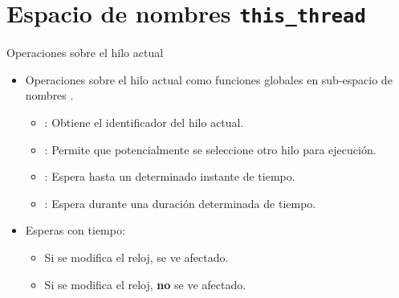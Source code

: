 \section{Espacio de nombres \texttt{this\_thread}}

\begin{frame}[t]{Operaciones sobre el hilo actual}
\begin{itemize}
  \item Operaciones sobre el hilo actual como funciones globales en sub-espacio de nombres .
    \begin{itemize}
      \item {}: Obtiene el identificador del hilo actual.
      \item {}: Permite que potencialmente se seleccione otro hilo para ejecución.
      \item {}: Espera hasta un determinado instante de tiempo.
      \item {}: Espera durante una duración determinada de tiempo.
    \end{itemize}
  \item Esperas con tiempo:
    \begin{itemize}
      \item Si se modifica el reloj,  se ve afectado.
      \item Si se modifica el reloj,  \textbf{no} se ve afectado.
    \end{itemize}
\end{itemize}
\end{frame}

